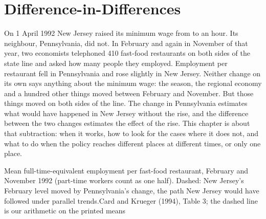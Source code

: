 \chapter{Difference-in-Differences}\label{ch:b3:difference-in-differences}

On 1 April 1992 New Jersey raised its minimum wage from  to
 an hour. Its neighbour, Pennsylvania, did not. In February and
again in November of that year, two economists telephoned 410 fast-food
restaurants on both sides of the state line and asked how many people they
employed. %
Employment per restaurant fell in Pennsylvania and rose slightly in New
Jersey. %
Neither change on its own says anything about the minimum wage: the season,
the regional economy and a hundred other things moved between February and
November. But those things moved on both sides of the line. The change in
Pennsylvania estimates what would have happened in New Jersey without the
rise, and the difference between the two changes estimates the effect of the
rise. This chapter is about that subtraction: when it works, how to look for
the cases where it does not, and what to do when the policy reaches different
places at different times, or only one place.

\begin{openingchart}{Mean full-time-equivalent employment per fast-food
restaurant, February and November 1992 (part-time workers count as one half).
Dashed: New Jersey's February level moved by Pennsylvania's change, the
path New Jersey would have followed under parallel trends.}{Card and Krueger
(1994), Table 3; the dashed line is our arithmetic on the printed means}
\end{openingchart}

